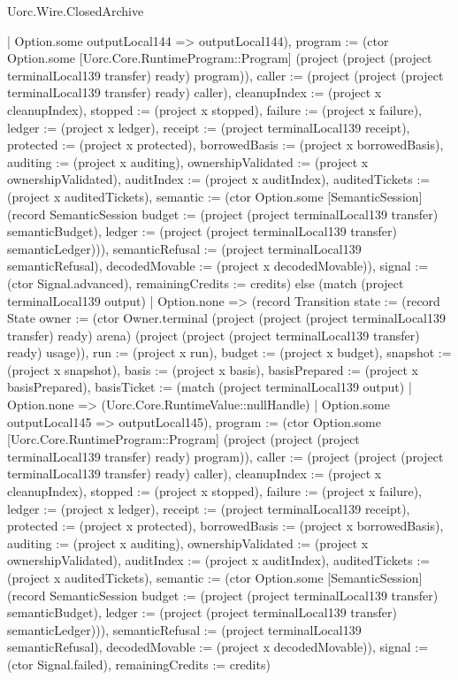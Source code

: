 \begin{lexlean}{Uorc.Wire.ClosedArchive}
\begin{semanticmodule}
{{{            | Option.some outputLocal144 => outputLocal144), program := (ctor Option.some [Uorc.Core.RuntimeProgram::Program] (project (project (project terminalLocal139 transfer) ready) program)), caller := (project (project (project terminalLocal139 transfer) ready) caller), cleanupIndex := (project x cleanupIndex), stopped := (project x stopped), failure := (project x failure), ledger := (project x ledger), receipt := (project terminalLocal139 receipt), protected := (project x protected), borrowedBasis := (project x borrowedBasis), auditing := (project x auditing), ownershipValidated := (project x ownershipValidated), auditIndex := (project x auditIndex), auditedTickets := (project x auditedTickets), semantic := (ctor Option.some [SemanticSession] (record SemanticSession {budget := (project (project terminalLocal139 transfer) semanticBudget), ledger := (project (project terminalLocal139 transfer) semanticLedger)})), semanticRefusal := (project terminalLocal139 semanticRefusal), decodedMovable := (project x decodedMovable)}), signal := (ctor Signal.advanced), remainingCredits := credits}) else (match (project terminalLocal139 output)
            | Option.none => (record Transition {state := (record State {owner := (ctor Owner.terminal (project (project (project terminalLocal139 transfer) ready) arena) (project (project (project terminalLocal139 transfer) ready) usage)), run := (project x run), budget := (project x budget), snapshot := (project x snapshot), basis := (project x basis), basisPrepared := (project x basisPrepared), basisTicket := (match (project terminalLocal139 output)
              | Option.none => (Uorc.Core.RuntimeValue::nullHandle)
              | Option.some outputLocal145 => outputLocal145), program := (ctor Option.some [Uorc.Core.RuntimeProgram::Program] (project (project (project terminalLocal139 transfer) ready) program)), caller := (project (project (project terminalLocal139 transfer) ready) caller), cleanupIndex := (project x cleanupIndex), stopped := (project x stopped), failure := (project x failure), ledger := (project x ledger), receipt := (project terminalLocal139 receipt), protected := (project x protected), borrowedBasis := (project x borrowedBasis), auditing := (project x auditing), ownershipValidated := (project x ownershipValidated), auditIndex := (project x auditIndex), auditedTickets := (project x auditedTickets), semantic := (ctor Option.some [SemanticSession] (record SemanticSession {budget := (project (project terminalLocal139 transfer) semanticBudget), ledger := (project (project terminalLocal139 transfer) semanticLedger)})), semanticRefusal := (project terminalLocal139 semanticRefusal), decodedMovable := (project x decodedMovable)}), signal := (ctor Signal.failed), remainingCredits := credits})
}
\end{semanticmodule}
\end{lexlean}
